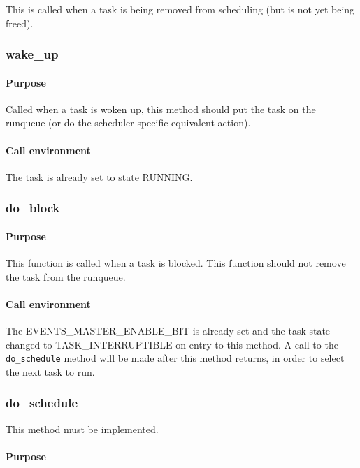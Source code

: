 \documentclass[11pt,twoside,final,openright]{xenstyle}
\begin{document}
This is called when a task is being removed from scheduling (but is
not yet being freed).

\subsubsection{wake\_up}

\paragraph*{Purpose}

Called when a task is woken up, this method should put the task on the runqueue
(or do the scheduler-specific equivalent action).

\paragraph*{Call environment}

The task is already set to state RUNNING.

\subsubsection{do\_block}

\paragraph*{Purpose}

This function is called when a task is blocked.  This function should
not remove the task from the runqueue.

\paragraph*{Call environment}

The EVENTS\_MASTER\_ENABLE\_BIT is already set and the task state changed to
TASK\_INTERRUPTIBLE on entry to this method.  A call to the {\tt
  do\_schedule} method will be made after this method returns, in
order to select the next task to run.

\subsubsection{do\_schedule}

This method must be implemented.

\paragraph*{Purpose}
\end{document}
